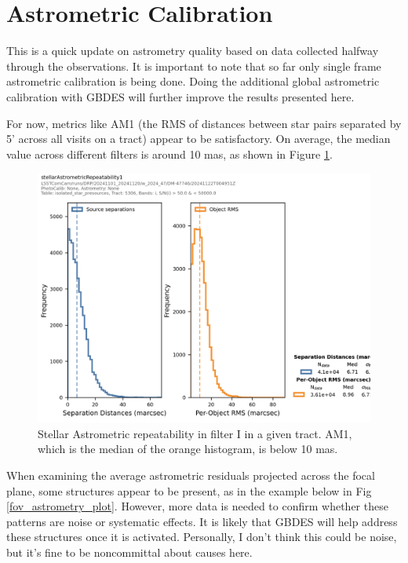 \section{Astrometric Calibration}
\label{sec:astrometric_calibration}


This is a quick update on astrometry quality based on data collected halfway through the \ComCam observations. It is important to note that so far only single frame astrometric calibration is being done. Doing the additional global astrometric calibration with GBDES will further improve the results presented here.


For now, metrics like AM1 (the RMS of distances between star pairs separated by 5’ across all visits on a tract) appear to be satisfactory. On average, the median value across different filters is around 10 mas, as shown in Figure \ref{AM1_plot}.

\begin{figure}
        \centering
        \includegraphics[scale=0.47]{figures/11d0c9f8-45f6-4bf2-871a-56e00e62060c}
        \caption{\small Stellar Astrometric repeatability in filter I in a given tract. AM1, which is the median of the orange histogram,  is below 10 mas.}
        \label{AM1_plot}
\end{figure}

When examining the average astrometric residuals projected across the focal plane, some structures appear to be present, as in the example below in Fig \ref{fov_astrometry_plot}. However, more data is needed to confirm whether these patterns are noise or systematic effects. It is likely that GBDES will help address these structures once it is activated. Personally, I don’t think this could be noise, but it’s fine to be noncommittal about causes here.

